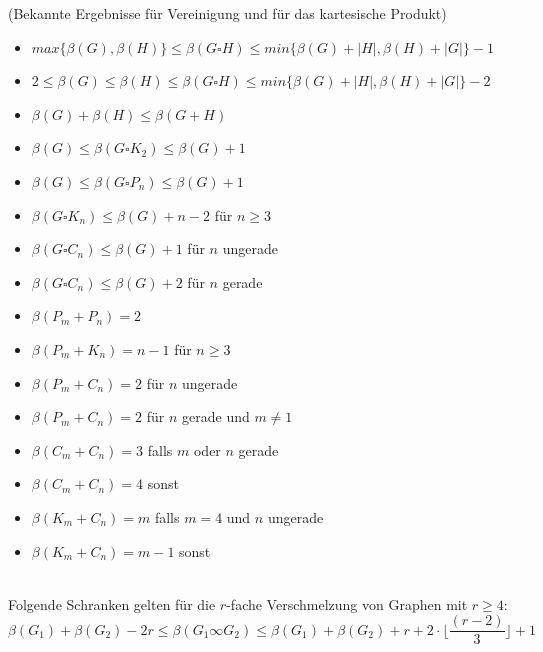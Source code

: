 \begin{lem}(Bekannte Ergebnisse für Vereinigung und für das kartesische Produkt\cite{somefamiliesofgraphs})
\begin{itemize}
\item $max\{\beta(G),\beta(H)\}\leq \beta(G\square H) \leq min\{\beta(G)+|H|,\beta(H)+|G|\}-1$
\item $2 \leq \beta(G) \leq \beta(H) \leq \beta(G\square H) \leq min\{\beta(G)+|H|,\beta(H)+|G|\}-2$
\item $\beta(G)+\beta(H) \leq \beta(G+H)$
\item $\beta(G)\leq \beta(G\square K_2) \leq \beta(G)+1$
\item $\beta(G)\leq \beta(G\square P_n) \leq \beta(G)+1$
\item $\beta(G\square K_n) \leq \beta(G)+n-2$ für $n \geq 3$
\item $\beta(G\square C_n) \leq \beta(G)+1$ für $n$ ungerade
\item $\beta(G\square C_n) \leq \beta(G)+2$ für $n$ gerade
\item $\beta(P_m+P_n)=2$
\item $\beta(P_m+K_n)=n-1$ für $n\geq 3$
\item $\beta(P_m+C_n)=2$ für $n$ ungerade
\item $\beta(P_m+C_n)=2$ für $n$ gerade und $m \neq 1$
\item $\beta(C_m+C_n)=3$ falls $m$ oder $n$ gerade
\item $\beta(C_m+C_n)=4$ sonst
\item $\beta(K_m+C_n)=m$ falls $m=4$ und $n$ ungerade
\item $\beta(K_m+C_n)=m-1$ sonst
\end{itemize}
\end{lem}

\begin{lem}$\;\;$\\Folgende Schranken gelten für die $r$-fache Verschmelzung von Graphen mit $r \geq 4$:
$$\beta(G_1)+\beta(G_2)-2r \leq \beta(G_1 \infty G_2) \leq \beta(G_1)+\beta(G_2)+r+2 \cdot \lfloor\frac{(r-2)}{3}\rfloor+1$$
\end{lem}

